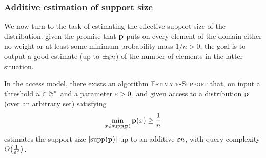 \subsubsection{Additive estimation of support size}
We now turn to the task of estimating the effective support size of the distribution: given the promise that $\mathbf{p}$ puts on every element of the domain either no weight or at least some minimum probability mass $1/n > 0$, the goal is to output a good estimate (up to $\pm\varepsilon n$) of the number of elements in the latter situation.

\begin{theorem}\label{theorem:support:estimation:additive:extended:access}
In the \pdfsamp access model, there exists an algorithm \textsc{Estimate-Support} that, on input a threshold $n\in\mathbb{N}^\ast$ and a parameter $\varepsilon > 0$, and given access to a distribution $\mathbf{p}$ (over an arbitrary set) satisfying 
\[ \min_{x\in\operatorname{supp}\!\left(\mathbf{p}\right)} \mathbf{p}(x) \geq \frac{1}{n} \]
estimates the support size $\left\lvert \operatorname{supp}\!\left(\mathbf{p}\right) \right\rvert$ up to an additive $\varepsilon n$, with query complexity $\bigO{\frac{1}{\eps^2}}$.
\end{theorem}
